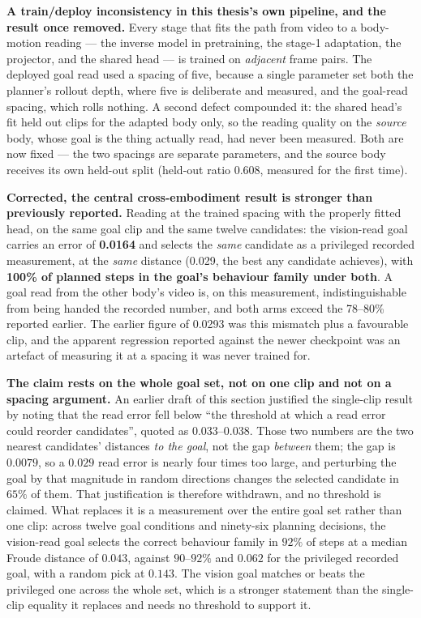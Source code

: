 \documentclass[12pt,a4paper,oneside]{report}
\begin{document}
\noindent\textbf{A train/deploy inconsistency in this thesis's own pipeline, and the result once removed.}
Every stage that fits the path from video to a body-motion reading --- the inverse model in pretraining, the
stage-1 adaptation, the projector, and the shared head --- is trained on \emph{adjacent} frame pairs. The deployed
goal read used a spacing of five, because a single parameter set both the planner's rollout depth, where five is
deliberate and measured, and the goal-read spacing, which rolls nothing. A second defect compounded it: the shared
head's fit held out clips for the adapted body only, so the reading quality on the \emph{source} body, whose goal
is the thing actually read, had never been measured. Both are now fixed --- the two spacings are separate
parameters, and the source body receives its own held-out split (held-out ratio 0.608, measured for the first
time).

\noindent\textbf{Corrected, the central cross-embodiment result is stronger than previously reported.} Reading at
the trained spacing with the properly fitted head, on the same goal clip and the same twelve candidates: the
vision-read goal carries an error of \textbf{0.0164} and selects the \emph{same} candidate as a privileged
recorded measurement, at the \emph{same} distance (0.029, the best any candidate achieves), with
\textbf{100\% of planned steps in the goal's behaviour family under both}. A goal read from the other body's
video is, on this measurement, indistinguishable from being handed the recorded number, and both arms exceed the
78--80\% reported earlier. The earlier figure of 0.0293 was this
mismatch plus a favourable clip, and the apparent regression reported against the newer checkpoint was an artefact
of measuring it at a spacing it was never trained for.

\noindent\textbf{The claim rests on the whole goal set, not on one clip and not on a spacing argument.} An earlier
draft of this section justified the single-clip result by noting that the read error fell below ``the threshold at
which a read error could reorder candidates'', quoted as $0.033$--$0.038$. Those two numbers are the two nearest
candidates' distances \emph{to the goal}, not the gap \emph{between} them; the gap is $0.0079$, so a $0.029$ read
error is nearly four times too large, and perturbing the goal by that magnitude in random directions changes the
selected candidate in $65\%$ of them. That justification is therefore withdrawn, and no threshold is claimed. What
replaces it is a measurement over the entire goal set rather than one clip: across twelve goal conditions and
ninety-six planning decisions, the vision-read goal selects the correct behaviour family in $92\%$ of steps at a
median Froude distance of $0.043$, against $90$--$92\%$ and $0.062$ for the privileged recorded goal, with a
random pick at $0.143$. The vision goal matches or beats the privileged one across the whole set, which is a
stronger statement than the single-clip equality it replaces and needs no threshold to support it.
\end{document}
